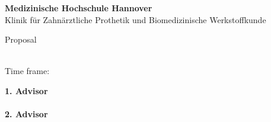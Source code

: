 \begin{titlepage}
\begin{center}
\LARGE{\textbf{Medizinische Hochschule Hannover}}\\
\normalsize{Klinik für Zahnärztliche Prothetik und Biomedizinische Werkstoffkunde}\\[0.3cm]

\vspace{2cm}

\LARGE{{\thesisType} Proposal}\\[0.7cm]
\Huge{\textbf{\thesisTitle}}

\vspace{2cm} 

\Large{\textbf{\name}} \\[3pt]  
\vspace{0.5cm}
\large{Time frame: \timeFrame} \\ 

\vspace{2cm}

\large{\textbf{1. Advisor}}\\
\supervisor\\
\vspace{0.5cm}
\textbf{2. Advisor}\\
\advisor\\
\end{center}
\end{titlepage}
